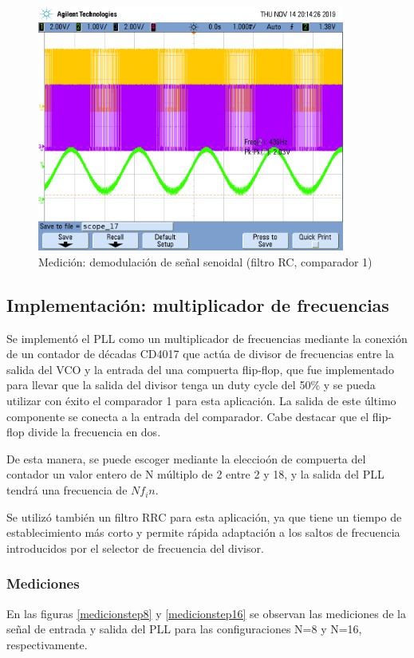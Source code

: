 \begin{figure}[H]
    \centering
    \includegraphics[width=0.9\textwidth]{resources/demodulacionfmsenoidalcomp1.png}
    \caption{Medición: demodulación de señal senoidal (filtro RC, comparador 1)}
    \label{modulacionfmsenoidalcomp1}
\end{figure}

\subsection{Implementación: multiplicador de frecuencias}
Se implementó el PLL como un multiplicador de frecuencias mediante la conexión de un contador de décadas CD4017 que actúa de divisor de frecuencias entre la salida del VCO y la entrada del una compuerta flip-flop, que fue implementado para llevar que la salida del divisor tenga un duty cycle del 50\% y se pueda utilizar con éxito el comparador 1 para esta aplicación. La salida de este último componente se conecta a la entrada del comparador. Cabe destacar que el flip-flop divide la frecuencia en dos.

De esta manera, se puede escoger mediante la eleccioón de compuerta del contador un valor entero de N múltiplo de 2 entre 2 y 18, y la salida del PLL tendrá una frecuencia de $Nf_in$.


Se utilizó también un filtro RRC para esta aplicación, ya que tiene un tiempo de establecimiento más corto y permite rápida adaptación a los saltos de frecuencia introducidos por el selector de frecuencia del divisor.

\subsubsection{Mediciones}
En las figuras \ref{medicionstep8} y \ref{medicionstep16} se observan las mediciones de la señal de entrada y salida del PLL para las configuraciones N=8 y N=16, respectivamente.

